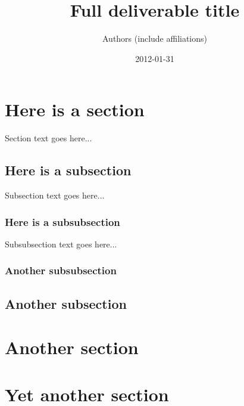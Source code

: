\documentclass{james-deliverable}
\title{Full deliverable title}
\author{Authors (include affiliations)}
\date{2012-01-31}
\begin{document}
\maketitle


\section{Here is a section}

Section text goes here...

\subsection{Here is a subsection}

Subsection text goes here...

\subsubsection{Here is a subsubsection}

Subsubsection text goes here...

\subsubsection{Another subsubsection}

\subsection{Another subsection}

\section{Another section}

\section{Yet another section}
\end{document}
